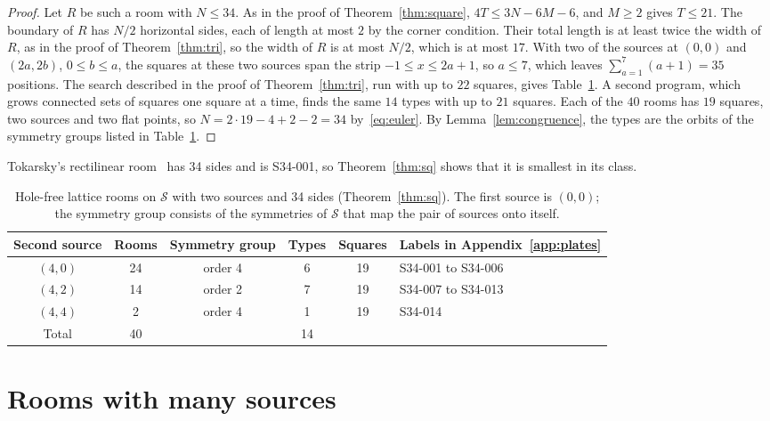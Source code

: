 \documentclass[11pt,a4paper]{article}
\theoremstyle{plain}
\theoremstyle{definition}
\theoremstyle{remark}
\newcommand{\Sq}{\mathcal{S}}
\numberwithin{equation}{section}
\begin{document}
\begin{proof}
Let $R$ be such a room with $N\le34$. As in the proof of Theorem~\ref{thm:square}, $4T\le3N-6M-6$, and $M\ge2$ gives $T\le21$. The boundary of $R$ has $N/2$ horizontal sides, each of length at most $2$ by the corner condition. Their total length is at least twice the width of $R$, as in the proof of Theorem~\ref{thm:tri}, so the width of $R$ is at most $N/2$, which is at most $17$. With two of the sources at $(0,0)$ and $(2a,2b)$, $0\le b\le a$, the squares at these two sources span the strip $-1\le x\le2a+1$, so $a\le7$, which leaves $\sum_{a=1}^{7}(a+1)=35$ positions. The search described in the proof of Theorem~\ref{thm:tri}, run with up to $22$ squares, gives Table~\ref{tab:sq}. A second program, which grows connected sets of squares one square at a time, finds the same $14$ types with up to $21$ squares. Each of the $40$ rooms has $19$ squares, two sources and two flat points, so $N=2\cdot19-4+2-2=34$ by~\eqref{eq:euler}. By Lemma~\ref{lem:congruence}, the types are the orbits of the symmetry groups listed in Table~\ref{tab:sq}.
\end{proof}

Tokarsky's rectilinear room~\cite[Figure~9]{Tok95} has 34 sides and is S34-001, so Theorem~\ref{thm:sq} shows that it is smallest in its class.

\begin{table}[htbp]
\centering\small
\begin{tabular}{@{}cccccl@{}}
\toprule
Second source & Rooms & Symmetry group & Types & Squares & Labels in Appendix~\ref{app:plates}\\
\midrule
$(4,0)$ & 24 & order 4 & 6 & 19 & S34-001 to S34-006\\
$(4,2)$ & 14 & order 2 & 7 & 19 & S34-007 to S34-013\\
$(4,4)$ & 2 & order 4 & 1 & 19 & S34-014\\
\midrule
Total & 40 & & 14 & &\\
\bottomrule
\end{tabular}
\caption{Hole-free lattice rooms on $\Sq$ with two sources and 34 sides (Theorem~\ref{thm:sq}). The first source is $(0,0)$; the symmetry group consists of the symmetries of $\Sq$ that map the pair of sources onto itself.}
\label{tab:sq}
\end{table}

\section{Rooms with many sources}\label{sec:many}
\end{document}
